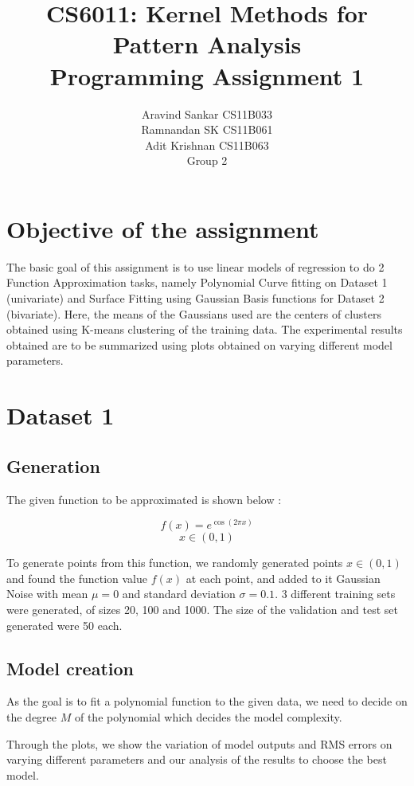 \documentclass{article}
\begin{document}
\title{\textbf{CS6011: Kernel Methods for Pattern Analysis}
\\
\textbf{Programming Assignment 1}
}
\author{Aravind Sankar CS11B033 \\
Ramnandan SK CS11B061 \\
Adit Krishnan CS11B063 \\[0.2in]
Group 2
}

\maketitle
\tableofcontents 

\section{Objective of the assignment}
The basic goal of this assignment is to use linear models of regression to do 2 Function Approximation tasks, namely Polynomial Curve fitting on Dataset 1 (univariate) and Surface Fitting using Gaussian Basis functions for Dataset 2 (bivariate). Here, the means of the Gaussians used are the centers of clusters obtained using K-means clustering of the training data. The experimental results obtained are to be summarized using plots obtained on varying different model parameters.
\section{Dataset 1}

\subsection{Generation}
The given function to be approximated is shown below :

\[ f(x) = e^{\cos(2 \pi x)} \]
\[ x \in (0,1) \]

\begin{flushleft}
To generate points from this function, we randomly generated points $x \in (0,1)$ and found the function value $f(x)$ at each point, and added to it Gaussian Noise with mean $\mu = 0$ and standard deviation $\sigma = 0.1$. 3 different training sets were generated, of sizes 20, 100 and 1000. The size of the validation and test set generated were 50 each.
\end{flushleft}

\subsection{Model creation}
\begin{flushleft}
As the goal is to fit a polynomial function to the given data, we need to decide on the degree $M$ of the polynomial which decides the model complexity. 

Through the plots, we show the variation of model outputs and RMS errors on varying different 
parameters and our analysis of the results to choose the best model.

\end{flushleft}
\end{document}
